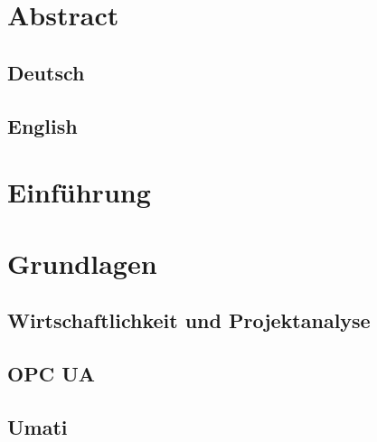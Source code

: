 \documentclass[a4paper, 12pt, oneside]{scrbook}
\begin{document}
	\frontmatter
	
	\tableofcontents
	\listoffigures
	\listoftables
	\nocite{*}

	\mainmatter
	
	\chapter*{Abstract}
	
	\section*{Deutsch}
	
	
	\section*{English}
	
	\pagebreak
	\chapter{Einführung}
	
	
	
	\chapter{Grundlagen}
	
	\section{Wirtschaftlichkeit und Projektanalyse}
	
	
	
	\section{OPC UA}
		
	
	\section{Umati}
	
\end{document}
